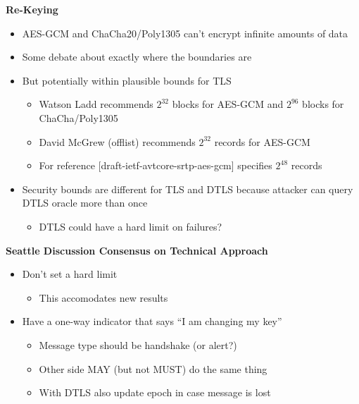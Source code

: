 \documentclass[helvetica]{seminar}
\newcommand{\heading}[1]{%
  \begin{center} 
    \large\bf 
    #1 
  \end{center} 
  \vspace{.4 in}}
\begin{document}
\begin{slide}
\heading{Re-Keying}

\vspace{-3ex}
\begin{itemize}
\item AES-GCM and ChaCha20/Poly1305 can't encrypt infinite amounts of data
\item Some debate about exactly where the boundaries are
\item But potentially within plausible bounds for TLS
    \begin{itemize}
    \item Watson Ladd recommends $2^{32}$ blocks for AES-GCM and $2^{96}$ blocks for ChaCha/Poly1305
    \item David McGrew (offlist) recommends $2^{32}$ records for AES-GCM
    \item For reference [draft-ietf-avtcore-srtp-aes-gcm] specifies $2^{48}$ records
  \end{itemize}

\item Security bounds are different for TLS and DTLS because attacker can query
  DTLS oracle more than once
  \begin{itemize}
  \item DTLS could have a hard limit on failures?
  \end{itemize}
\end{itemize}
\end{slide}

\begin{slide}
\heading{Seattle Discussion Consensus on Technical Approach}

\begin{itemize}
\item Don't set a hard limit
  \begin{itemize}
  \item This accomodates new results
  \end{itemize}

\item Have a one-way indicator that says ``I am changing my key''
  \begin{itemize}
  \item Message type should be handshake (or alert?)
  \item Other side MAY (but not MUST) do the same thing
  \item With DTLS also update epoch in case message is lost
  \end{itemize}
\end{itemize}
\end{slide}
\end{document}
